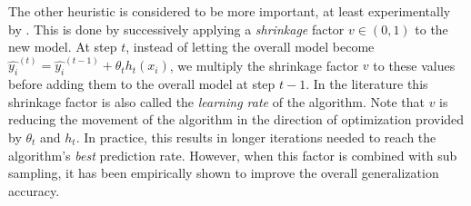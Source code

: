 The other heuristic is considered to be more important, at least experimentally by \textcite{hastie-elemstatslearn}. This is done by successively applying a \textit{shrinkage} factor $v \in  (0,1)$ to the new model.  At step $t$, instead of letting the overall model become $ \hat{y_i}^{(t)} = \hat{y_i}^{(t-1)} +  \theta_t h_t(x_i) $, we multiply the shrinkage factor $v$ to these values before adding them to the overall model at step $t-1$. In the literature this shrinkage factor is also called the \textit{learning rate} of the algorithm.  Note that $v$  is reducing the movement of the algorithm in the direction of optimization provided by $\theta_t$ and $h_t$. In practice, this results in longer iterations needed to reach the algorithm's \textit{best} prediction rate. However, when this factor is combined with sub sampling, it has been empirically shown to improve the overall generalization accuracy.



%
%
%
%
%
